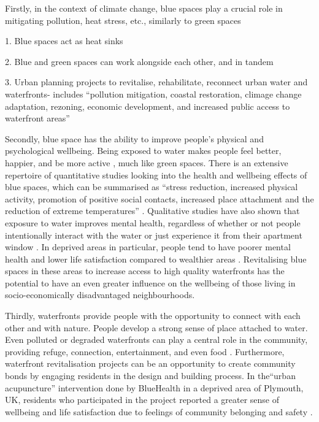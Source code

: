 \documentclass{article}
\begin{document}
Firstly, in the context of climate change, blue spaces play a crucial role in mitigating pollution, heat stress, etc., similarly to green spaces

	1. Blue spaces act as heat sinks \parencite{lin2020water}

	2. Blue and green spaces can work alongside each other, and in tandem

	3. Urban planning projects to revitalise, rehabilitate, reconnect urban water and waterfronts- includes  ``pollution mitigation, coastal restoration, climage change adaptation, rezoning, economic development, and increased public access to waterfront areas'' \parencite{toomey2021place}

Secondly, blue space has the ability to improve people's physical and psychological wellbeing. Being exposed to water makes people feel better, happier, and be more active \parencite{gascon2017outdoor}, much like green spaces. 
There is an extensive repertoire of quantitative studies looking into the health and wellbeing effects of blue spaces, which can be summarised as ``stress reduction, increased physical activity, promotion of positive social contacts, increased place attachment and the reduction of extreme temperatures'' \parencite{gascon2017outdoor}. Qualitative studies have also shown that exposure to water improves mental health, regardless of whether or not people intentionally interact with the water or just experience it from their apartment window \parencite{garrett2019urban}.
In deprived areas in particular, people tend to have poorer mental health and lower life satisfaction compared to wealthier areas \parencite{van2021urban}. Revitalising blue spaces in these areas to increase access to high quality waterfronts has the potential to have an even greater influence on the wellbeing of those living in socio-economically disadvantaged neighbourhoods.

Thirdly, waterfronts provide people with the opportunity to connect with each other and with nature. People develop a strong sense of place attached to water. Even polluted or degraded waterfronts can play a central role in the community, providing refuge, connection, entertainment, and even food \parencite{toomey2021place}. 
Furthermore, waterfront revitalisation projects can be an opportunity to create community bonds by engaging residents in the design and building process. In the``urban acupuncture'' intervention done by BlueHealth in a deprived area of Plymouth, UK, residents who participated in the project reported a greater sense of wellbeing and life satisfaction due to feelings of community belonging and safety \parencite{van2021urban}.
\end{document}
